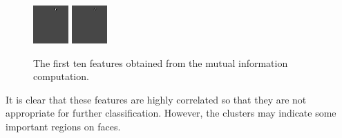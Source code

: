 \begin{figure}[ht]
\begin{center}
  \includegraphics[width=\columnwidth/11]{ch5/figures/mutinf_09.png}
  \includegraphics[width=\columnwidth/11]{ch5/figures/mutinf_10.png}\\
  \caption{The first ten features obtained from the mutual information computation.}
  \label{fig:mutinf10features}
 \end{center}
\end{figure} 
It is clear that these features are highly correlated so that they are not appropriate for further classification. However, the clusters may indicate some important regions on faces.